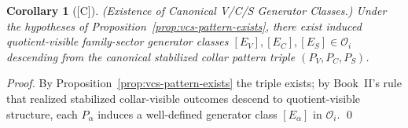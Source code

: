 \documentclass[12pt,oneside]{amsbook}
\theoremstyle{plain}
\newtheorem{corollary}[theorem]{Corollary}
\theoremstyle{definition}
\theoremstyle{remark}
\newcommand{\status}[1]{\textup{[#1]}}
\begin{document}
\begin{corollary}[\status{C}]\label{cor:vcs-generators-exist}
\textup{(Existence of Canonical V/C/S Generator Classes.)}
Under the hypotheses of Proposition~\ref{prop:vcs-pattern-exists},
there exist induced quotient-visible family-sector generator classes
$[E_V], [E_C], [E_S] \in \mathcal{O}_i$ descending from the
canonical stabilized collar pattern triple $(P_V, P_C, P_S)$.
\end{corollary}

\begin{proof}
By Proposition~\ref{prop:vcs-pattern-exists} the triple exists; by
Book~II's rule that realized stabilized collar-visible outcomes
descend to quotient-visible structure, each $P_\alpha$ induces a
well-defined generator class $[E_\alpha]$ in $\mathcal{O}_i$. \qed
\end{proof}
\end{document}
